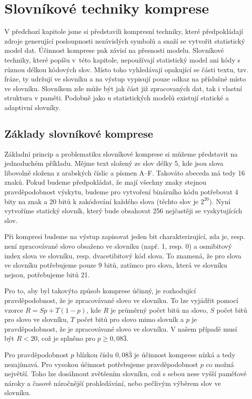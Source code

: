 \chapter{Slovníkové techniky komprese}
\label{kapitolaSlovnikovaKomprese}
V předchozí kapitole jsme si představili kompresní techniky, které předpokládají zdroje generující posloupnosti nezávislých symbolů a snaží se vytvořit statistický model dat. Účinnost komprese pak závisí  na přesnosti modelu. Slovníkové techniky, které popíšu v~této kapitole, nepoužívají statistický model ani kódy s různou délkou kódových slov. Místo toho vyhledávají opakující se části textu, tzv. fráze, ty udržují ve slovníku a na výstup vypisují pouze odkaz na příslušné místo ve slovníku. Slovníkem zde může být jak část již zpracovaných dat, tak i vlastní struktura v paměti. Podobně jako u statistických modelů existují statické a adaptivní slovníky.

\section{Základy slovníkové komprese}
Základní princip a problematiku slovníkové komprese si můžeme představit na jednoduchém příkladu. Mějme text složený ze slov délky 5, kde jsou slova libovolně složena z arabských číslic a písmen A--F. Takováto abeceda má tedy 16 znaků. Pokud budeme předpokládat, že mají všechny znaky stejnou pravděpodobnost výskytu, budeme pro vytvoření binárního kódu potřebovat 4 bity na znak a 20 bitů k zakódování každého slova (těchto slov je $2^{20}$). Nyní vytvoříme statický slovník, který bude obsahovat 256 nejčastěji se vyskytujících slov.

Při kompresi budeme na výstup zapisovat jeden bit charakterizující, zda je, resp. není zpracovávané slovo obsaženo ve slovníku (např. 1, resp. 0) a osmibitový index slova ve slovníku, resp. dvacetibitový kód slova. To znamená, že pro slova ve slovníku potřebujeme pouze 9 bitů, zatímco pro slova, která ve slovníku nejsou, potřebujeme bitů 21.

Pro to, aby byl takovýto způsob komprese účinný, je rozhodující pravděpodobnost, že je zpracovávané slovo ve slovníku. To lze vyjádřit pomocí vzorce $R = Sp + T(1-p)$, kde $R$ je průměrný počet bitů na slovo, $S$ počet bitů pro slovo ve slovníku, $T$ počet bitů pro slovo mimo slovník a $p$ je pravděpodobnost, že je zpracovávané slovo ve slovníku. V našem případě musí být $R < 20$, což je splněno pro $p\geq 0,08\bar{3}$.

Pro pravděpodobnost $p$ blízkou číslu $0,08\bar{3}$ je účinnost komprese nízká a tedy nezajímavá. Pro vysokou účinnost potřebujeme pravděpodobnost $p$ co možná největší. Toho lze dosáhnout zvětšením slovníku, což s sebou nese vyšší paměťové nároky a časově náročnější prohledávání, nebo pečlivým výběrem slov ve slovníku.

